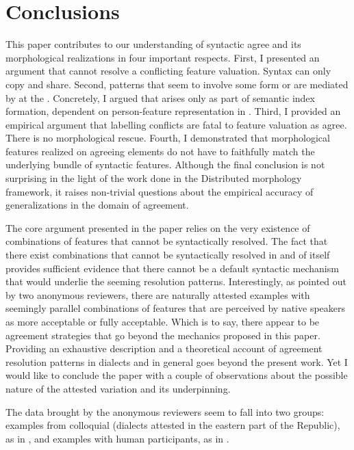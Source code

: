 \documentclass[output=paper,modfontsnewtxmath,hidelinks]{langscibook}
\begin{document}
\section{Conclusions}

This paper contributes to our understanding of syntactic agree and its morphological realizations in four important respects. First, I presented an argument that  cannot resolve a conflicting feature valuation. Syntax can only copy and share. Second, patterns that seem to involve some form or  are mediated by  at the . Concretely, I argued that  arises only as part of semantic index formation, dependent on person-feature representation in . Third, I provided an empirical argument that labelling conflicts are fatal to feature valuation as agree. There is no morphological rescue. Fourth, I demonstrated that morphological features realized on agreeing elements do not have to faithfully match the underlying bundle of syntactic features. Although the final conclusion is not surprising in the light of the work done in the Distributed morphology framework, it raises non-trivial questions about the empirical accuracy of generalizations in the domain of agreement. 

The core argument presented in the paper relies on the very existence of combinations of features that cannot be syntactically resolved. The fact that there exist combinations that cannot be syntactically resolved in and of itself provides sufficient evidence that there cannot be a default syntactic mechanism that would underlie the seeming resolution patterns. Interestingly, as pointed out by two anonymous reviewers, there are naturally attested examples with seemingly parallel combinations of features that are perceived by native speakers as more acceptable or fully acceptable. Which is to say, there appear to be agreement strategies that go beyond the mechanics proposed in this paper. Providing an exhaustive description and a theoretical account of agreement resolution patterns in  dialects and  in general  goes beyond the present work. Yet I would like to conclude the paper with a couple of observations about the possible nature of the attested variation and its underpinning.

The data brought by the anonymous reviewers seem to fall into two groups: examples from colloquial  (dialects attested in the eastern part of the  Republic), as in , and examples with human participants, as in .
\end{document}
